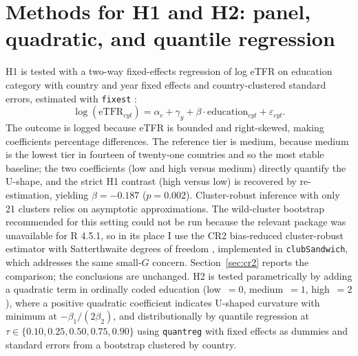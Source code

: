 \documentclass[12pt,a4paper]{report}
\begin{document}
\section{Methods for H1 and H2: panel, quadratic, and quantile regression}
H1 is tested with a two-way fixed-effects regression of log eTFR on education category with country
and year fixed effects and country-clustered standard errors, estimated with \texttt{fixest}
\citep{berge2018}:
\[
\log(\mathrm{eTFR}_{cyt}) = \alpha_c + \gamma_y + \beta\cdot\text{education}_{cyt} + \varepsilon_{cyt}.
\]
The outcome is logged because eTFR is bounded and right-skewed, making coefficients percentage
differences. The reference tier is medium, because medium is the lowest tier in fourteen of
twenty-one countries and so the most stable baseline; the two coefficients (low and high versus
medium) directly quantify the U-shape, and the strict H1 contrast (high versus low) is recovered
by re-estimation, yielding $\beta=-0.187$ ($p=0.002$). Cluster-robust inference with only 21
clusters relies on asymptotic approximations. The wild-cluster bootstrap recommended for this
setting \citep{cameron2008} could not be run because the relevant package was unavailable for R
4.5.1, so in its place I use the CR2 bias-reduced cluster-robust estimator with Satterthwaite degrees
of freedom \citep{pustejovskytipton2018}, implemented in \texttt{clubSandwich}, which addresses the
same small-$G$ concern. Section~\ref{sec:cr2} reports the comparison; the conclusions are unchanged. H2 is tested
parametrically by adding a quadratic term in ordinally coded education (low~$=0$, medium~$=1$,
high~$=2$), where a positive quadratic coefficient indicates U-shaped curvature with minimum at
$-\beta_1/(2\beta_2)$, and distributionally by quantile regression at $\tau\in\{0.10,0.25,0.50,0.75,0.90\}$
using \texttt{quantreg} \citep{koenker2005} with fixed effects as dummies and standard errors from
a bootstrap clustered by country.
\end{document}
